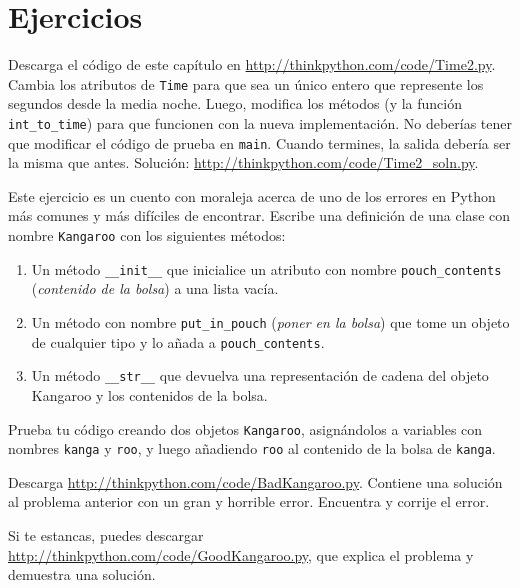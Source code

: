 \documentclass[10pt]{book}
\begin{document}
\section{Ejercicios}

\begin{exercise}

Descarga el código de este capítulo en
\url{http://thinkpython.com/code/Time2.py}.  Cambia los atributos de
    {\tt Time} para que sea un único entero que represente los segundos desde
    la media noche.  Luego, modifica los métodos (y la función
    \verb"int_to_time") para que funcionen con la nueva implementación.  No
    deberías tener que modificar el código de prueba en {\tt main}.  Cuando
    termines, la salida debería ser la misma que antes.  Solución:
    \url{http://thinkpython.com/code/Time2_soln.py}.

\end{exercise}


\begin{exercise}
\label{kangaroo}

Este ejercicio es un cuento con moraleja acerca de uno de los errores
en Python más comunes y más difíciles de encontrar.
Escribe una definición de una clase con nombre {\tt Kangaroo} con los siguientes
métodos:

\begin{enumerate}

\item Un método \verb"__init__" que inicialice un atributo con nombre
\verb"pouch_contents" ({\em contenido de la bolsa}) a una lista vacía.

\item Un método con nombre \verb"put_in_pouch" ({\em poner en la bolsa}) que tome un objeto
de cualquier tipo y lo añada a \verb"pouch_contents".

\item Un método \verb"__str__" que devuelva una representación de cadena
del objeto Kangaroo y los contenidos de la bolsa.

\end{enumerate}
%
Prueba tu código
creando dos objetos {\tt Kangaroo}, asignándolos a variables
con nombres {\tt kanga} y {\tt roo}, y luego añadiendo {\tt roo} al
contenido de la bolsa de {\tt kanga}.

Descarga \url{http://thinkpython.com/code/BadKangaroo.py}.  Contiene
una solución al problema anterior con un gran y horrible error.
Encuentra y corrije el error.

Si te estancas, puedes descargar
\url{http://thinkpython.com/code/GoodKangaroo.py}, que explica el
problema y demuestra una solución.

\end{exercise}
\end{document}
